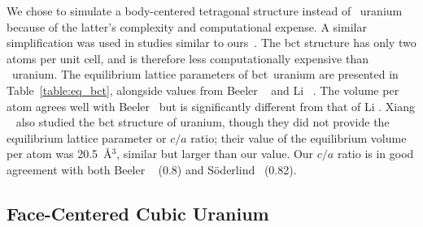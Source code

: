 We chose to simulate a body-centered tetragonal structure instead of
\textbeta~uranium because of the latter's complexity and computational expense.
A similar simplification was used in studies similar to
ours~\cite{beeler2013first,li2012structure}.
The bct structure has only two atoms per unit cell, and is therefore less
computationally expensive than \textbeta~uranium.
The equilibrium lattice parameters of bct~uranium are presented in
Table~\ref{table:eq_bct}, alongside values from Beeler
\etal~\cite{beeler2013first} and Li \etal~\cite{li2012structure}.
The volume per atom agrees well with Beeler \etal\ but is significantly
different from that of Li \etal.
Xiang \etal~\cite{xiang2008quantum} also studied the bct structure of uranium,
though they did not provide the equilibrium lattice parameter or $c/a$ ratio;
their value of the equilibrium volume per atom was 20.5~\AA$^3$, similar but
larger than our value. Our $c/a$ ratio is in good agreement with
both Beeler \etal~\cite{beeler2013first} (0.8) and
S\"oderlind~\cite{Soderlind1998} (0.82).

\subsection{Face-Centered Cubic Uranium}
\label{subsec_fcc}

